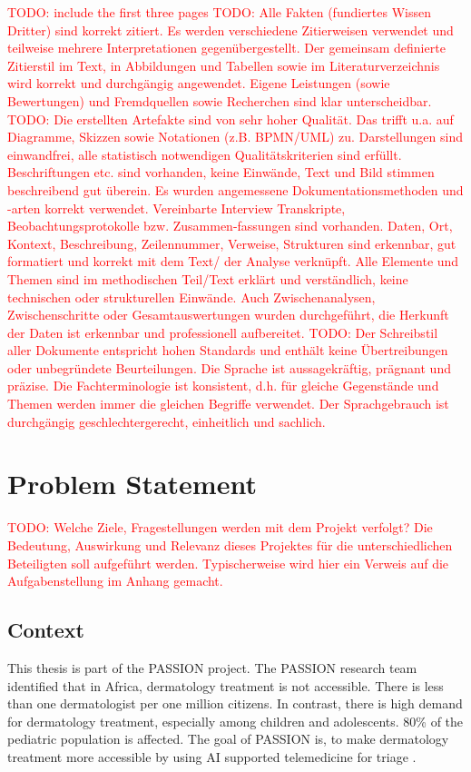 \documentclass[a4paper,10.5pt,
			   bindingoffset=0.2in,left=3.35cm,right=2.12cm,top=3.75cm,bottom=2.88cm,%
				footskip=.25in
				listof=numbered,toc=chapterentrywithdots]{scrreport}
\renewcommand{\todo}[1]{\textcolor{red}{TODO: #1}}
\begin{document}
	\todo{include the first three pages}
	\todo{Alle Fakten (fundiertes Wissen Dritter) sind korrekt zitiert. Es werden verschiedene Zitierweisen verwendet und teilweise mehrere Interpretationen gegenübergestellt. Der gemeinsam definierte Zitierstil im Text, in Abbildungen und Tabellen sowie im Literaturverzeichnis wird korrekt und durchgängig angewendet. Eigene Leistungen (sowie Bewertungen) und Fremdquellen sowie Recherchen sind klar unterscheidbar.} \linebreak
	\todo{Die erstellten Artefakte sind von sehr hoher Qualität. Das trifft u.a. auf Diagramme, Skizzen sowie Notationen (z.B. BPMN/UML) zu. Darstellungen sind einwandfrei, alle statistisch notwendigen Qualitätskriterien sind erfüllt. Beschriftungen etc. sind vorhanden, keine Einwände, Text und Bild stimmen beschreibend gut überein. Es wurden angemessene Dokumentationsmethoden und -arten korrekt verwendet. Vereinbarte Interview Transkripte, Beobachtungsprotokolle bzw. Zusammen-fassungen sind vorhanden. Daten, Ort, Kontext, Beschreibung, Zeilennummer, Verweise, Strukturen sind erkennbar, gut formatiert und korrekt mit dem Text/ der Analyse verknüpft. Alle Elemente und Themen sind im methodischen Teil/Text erklärt und verständlich, keine technischen oder strukturellen Einwände. Auch Zwischenanalysen, Zwischenschritte oder Gesamtauswertungen wurden durchgeführt, die Herkunft der Daten ist erkennbar und professionell aufbereitet.} \linebreak
	\todo{Der Schreibstil aller Dokumente entspricht hohen Standards und enthält keine Übertreibungen oder unbegründete Beurteilungen. Die Sprache ist aussagekräftig, prägnant und präzise. Die Fachterminologie ist konsistent, d.h. für gleiche Gegenstände und Themen werden immer die gleichen Begriffe verwendet. Der Sprachgebrauch ist durchgängig geschlechtergerecht, einheitlich und sachlich.}
	
	
	\chapter{Problem Statement}
		\todo{Welche Ziele, Fragestellungen werden mit dem Projekt verfolgt? Die Bedeutung, Auswirkung und Relevanz	dieses Projektes für die unterschiedlichen Beteiligten soll aufgeführt werden. Typischerweise wird hier ein Verweis auf die Aufgabenstellung im Anhang gemacht.}
	
		\section{Context}
			This thesis is part of the PASSION project. The PASSION research team identified that in Africa, dermatology treatment is not accessible. There is less than one dermatologist per one million citizens. In contrast, there is high demand for dermatology treatment, especially among children and adolescents. 80\% of the \gls{pediatric} population is affected. The goal of PASSION is, to make dermatology treatment more accessible by using AI supported telemedicine for triage \autocite{Gottfrois2024}.
		
\end{document}
